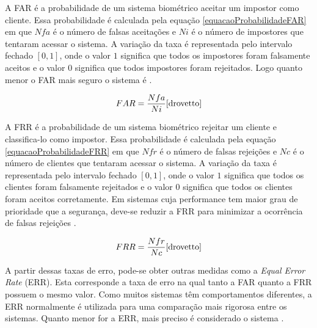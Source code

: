 A FAR é a probabilidade de um sistema biométrico aceitar um impostor como cliente. Essa probabilidade é calculada pela equação \ref{equacaoProbabilidadeFAR} em que $\displaystyle Nfa$ é o número de falsas aceitações e $\displaystyle Ni$ é o número de impostores que tentaram acessar o sistema. A variação da taxa é representada pelo intervalo fechado $\displaystyle [0,1]$, onde o valor $\displaystyle 1$ significa que todos os impostores foram falsamente aceitos e o valor $\displaystyle 0$ significa que todos impostores foram rejeitados. Logo quanto menor o FAR mais seguro o sistema é \cite{drovetto}.

	\begin{equation}
		FAR = \frac{Nfa}{Ni} \cite{drovetto}
		\label{equacaoProbabilidadeFAR}
	\end{equation} 

A FRR é a probabilidade de um sistema biométrico rejeitar um cliente e classifica-lo como impostor. Essa probabilidade é calculada pela equação \ref{equacaoProbabilidadeFRR} em que $\displaystyle Nfr$ é o número de falsas rejeições e $\displaystyle Nc$ é o número de clientes que tentaram acessar o sistema. A variação da taxa é representada pelo intervalo fechado $\displaystyle [0,1]$, onde o valor $\displaystyle 1$ significa que todos os clientes foram falsamente rejeitados e o valor $\displaystyle 0$ significa que todos os clientes foram aceitos corretamente. Em sistemas cuja performance tem maior grau de prioridade que a segurança, deve-se reduzir a FRR para minimizar a ocorrência de falsas rejeições \cite{drovetto}.

	\begin{equation}
		FRR = \frac{Nfr}{Nc} \cite{drovetto}
		\label{equacaoProbabilidadeFRR}
	\end{equation} 

A partir dessas taxas de erro, pode-se obter outras medidas como a \textit{Equal Error Rate} (ERR). Esta corresponde a taxa de erro na qual tanto a FAR quanto a FRR possuem o mesmo valor. Como muitos sistemas têm comportamentos diferentes, a ERR normalmente é utilizada para uma comparação mais rigorosa entre os sistemas. Quanto menor for a ERR, mais preciso é considerado o sistema \cite{drovetto}.
